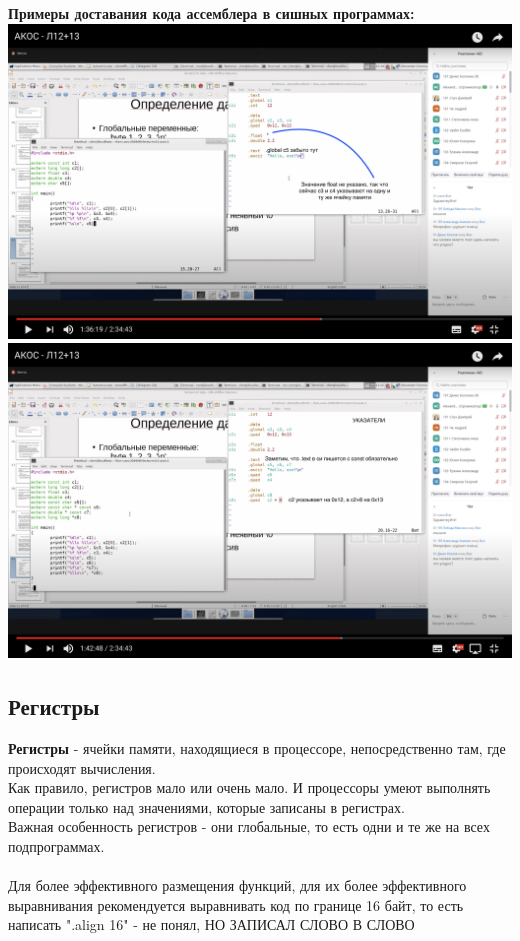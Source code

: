 \documentclass[12pt]{article}
\begin{document}
 \textbf{Примеры доставания кода ассемблера в сишных программах:} \\
  \includegraphics[scale=0.3]{./pic03.png} \\
    \includegraphics[scale=0.3]{./pic04.png} \\

\subsection{Регистры}
\textbf{Регистры} - ячейки памяти, находящиеся в процессоре, непосредственно там, где происходят вычисления. \\
Как правило, регистров мало или очень мало. И процессоры умеют выполнять операции только над значениями, которые записаны в регистрах. \\
Важная особенность регистров - они глобальные, то есть одни и те же на всех подпрограммах. 
\\
\\
Для более эффективного размещения функций, для их более эффективного выравнивания рекомендуется выравнивать код по границе 16 байт, то есть написать ".align 16" - не понял, НО ЗАПИСАЛ СЛОВО В СЛОВО 
\end{document}
